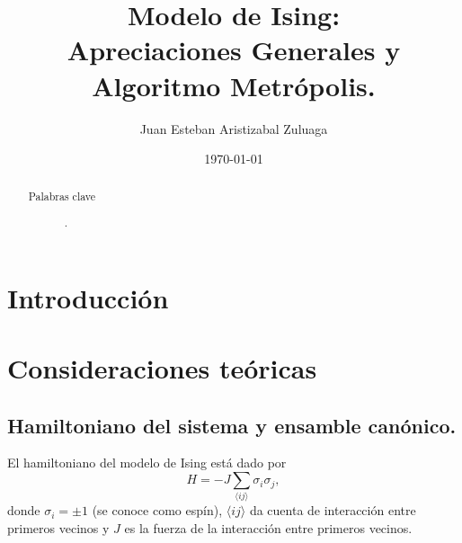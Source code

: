 \documentclass[%
 reprint,
 amsmath,amssymb,
 aps,
 pra,
]{revtex4-2}
\begin{document}

\title{Modelo de Ising:\texorpdfstring{\\}{ }Apreciaciones Generales y Algoritmo Metrópolis.}%

\author{Juan Esteban Aristizabal Zuluaga}

\date{\today}%

\begin{abstract}

\begin{description}
\item[Palabras clave] 	.
\end{description}
\end{abstract}

\maketitle

\onecolumngrid


	
\section{Introducción\label{sec:intro}}

\section{Consideraciones teóricas\label{sec:teoria-microestados}}


	\subsection{Hamiltoniano del sistema y ensamble canónico.\label{subsec:teoria-hamiltoniano}}
	
	El hamiltoniano del modelo de Ising está dado por
		\begin{equation}
			H = -J\sum_{\langle ij \rangle} \sigma_i \sigma_j, \label{eq:hamiltoniano}
		\end{equation}
	donde $\sigma_i = \pm 1$ (se conoce como espín),  $\langle ij \rangle$ da cuenta de interacción entre primeros vecinos y $J$ es la fuerza de la interacción entre primeros vecinos.
\end{document}
